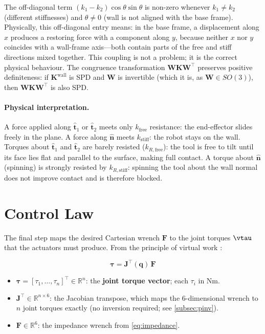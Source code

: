 The off-diagonal term $(k_1-k_2)\cos\theta\sin\theta$ is non-zero
whenever $k_1\neq k_2$ (different stiffnesses) and $\theta\neq 0$
(wall is not aligned with the base frame).
Physically, this off-diagonal entry means: in the base frame, a
displacement along $x$ produces a restoring force with a component
along $y$, because neither $x$ nor $y$ coincides with a wall-frame
axis---both contain parts of the free and stiff directions mixed together.
This coupling is not a problem; it is the correct physical behaviour.
The congruence transformation $\mathbf{WKW}^\top$ preserves positive
definiteness: if $\mathbf{K}^{\mathrm{wall}}$ is SPD and $\mathbf{W}$
is invertible (which it is, as $\mathbf{W}\in SO(3)$), then
$\mathbf{WKW}^\top$ is also SPD.

\paragraph{Physical interpretation.}
A force applied along $\hat{\mathbf{t}}_1$ or $\hat{\mathbf{t}}_2$
meets only $k_{\mathrm{free}}$ resistance: the end-effector slides
freely in the plane.
A force along $\hat{\mathbf{n}}$ meets $k_{\mathrm{stiff}}$: the
robot stays on the wall.
Torques about $\hat{\mathbf{t}}_1$ and $\hat{\mathbf{t}}_2$
are barely resisted ($k_{R,\mathrm{free}}$): the tool is free to tilt
until its face lies flat and parallel to the surface, making full contact.
A torque about $\hat{\mathbf{n}}$ (spinning) is strongly resisted
by $k_{R,\mathrm{stiff}}$: spinning the tool about the wall normal does
not improve contact and is therefore blocked.

\section{Control Law}
\label{sec:control_law}

The final step maps the desired Cartesian wrench $\mathbf{F}$ to the
joint torques $\vtau$ that the actuators must produce.
From the principle of virtual work \cite{Khatib1987}:

\begin{equation}
\label{eq:control_law}
\bm{\tau} = \mathbf{J}^\top(\mathbf{q})\,\mathbf{F}
\end{equation}

\begin{itemize}
  \item $\bm{\tau}=[\tau_1,\ldots,\tau_n]^\top\in\mathbb{R}^n$:
        the \textbf{joint torque vector}; each $\tau_i$ in Nm.
  \item $\mathbf{J}^\top\in\mathbb{R}^{n\times6}$: the Jacobian
        transpose, which maps the 6-dimensional wrench to $n$ joint
        torques exactly (no inversion required; see \cref{subsec:pinv}).
  \item $\mathbf{F}\in\mathbb{R}^6$: the impedance wrench from
        \cref{eq:impedance}.
\end{itemize}

